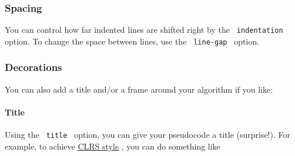 \pandocbounded{}

\subsubsection{Spacing}\label{spacing}

You can control how far indented lines are shifted right by the
\texttt{\ indentation\ } option. To change the space between lines, use
the \texttt{\ line-gap\ } option.

\begin{Shaded}
\begin{Highlighting}[]
\NormalTok{\#pseudocode{-}list(indentation: 3em, line{-}gap: 1.5em)[}
\NormalTok{]}
\end{Highlighting}
\end{Shaded}

\pandocbounded{}

\subsubsection{Decorations}\label{decorations}

You can also add a title and/or a frame around your algorithm if you
like:

\paragraph{Title}\label{title}

Using the \texttt{\ title\ } option, you can give your pseudocode a
title (surprise!). For example, to achieve
\href{https://en.wikipedia.org/wiki/Introduction_to_Algorithms}{CLRS
style} , you can do something like

\begin{Shaded}
\begin{Highlighting}[]
\NormalTok{\#pseudocode{-}list(stroke: none, title: smallcaps[Fancy{-}Algorithm])[}
\NormalTok{]}
\end{Highlighting}
\end{Shaded}

